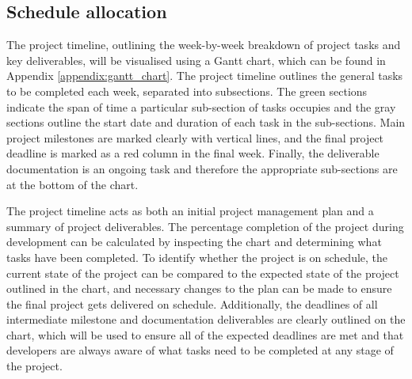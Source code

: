 \documentclass{article}
\begin{document}
\subsection{Schedule allocation}
\begin{adjustwidth}{1em}{0pt}

The project timeline, outlining the week-by-week breakdown of project tasks and key deliverables, will be visualised using a Gantt chart, which can be found in Appendix \ref{appendix:gantt_chart}. The project timeline outlines the general tasks to be completed each week, separated into subsections. The green sections indicate the span of time a particular sub-section of tasks occupies and the gray sections outline the start date and duration of each task in the sub-sections. Main project milestones are marked clearly with vertical lines, and the final project deadline is marked as a red column in the final week. Finally, the deliverable documentation is an ongoing task and therefore the appropriate sub-sections are at the bottom of the chart.

The project timeline acts as both an initial project management plan and a summary of project deliverables. The percentage completion of the project during development can be calculated by inspecting the chart and determining what tasks have been completed. To identify whether the project is on schedule, the current state of the project can be compared to the expected state of the project outlined in the chart, and necessary changes to the plan can be made to ensure the final project gets delivered on schedule. Additionally, the deadlines of all intermediate milestone and documentation deliverables are clearly outlined on the chart, which will be used to ensure all of the expected deadlines are met and that developers are always aware of what tasks need to be completed at any stage of the project.

\end{adjustwidth}

\end{document}
